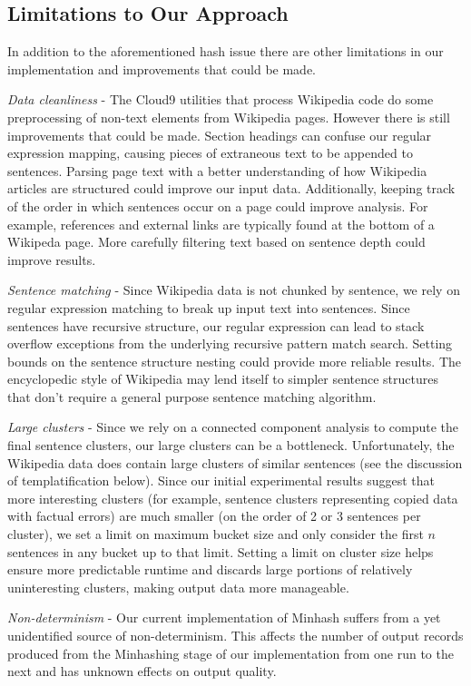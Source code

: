 \documentclass{acm_proc_article-sp}
\begin{document}
\subsection{Limitations to Our Approach}

In addition to the aforementioned hash issue there are other limitations in our implementation and improvements that could be made.

\emph{Data cleanliness} - The Cloud9 utilities that process Wikipedia code do some preprocessing of non-text elements from Wikipedia pages. However there is still improvements that could be made. Section headings can confuse our regular expression mapping, causing pieces of extraneous text to be appended to sentences. Parsing page text with a better understanding of how Wikipedia articles are structured could improve our input data. Additionally, keeping track of the order in which sentences occur on a page could improve analysis. For example, references and external links are typically found at the bottom of a Wikipeda page. More carefully filtering text based on sentence depth could improve results.

\emph{Sentence matching} - Since Wikipedia data is not chunked by sentence, we rely on regular expression matching to break up input text into sentences. Since sentences have recursive structure, our regular expression can lead to stack overflow exceptions from the underlying recursive pattern match search. Setting bounds on the sentence structure nesting could provide more reliable results. The encyclopedic style of Wikipedia may lend itself to simpler sentence structures that don't require a general purpose sentence matching algorithm.

\emph{Large clusters} - Since we rely on a connected component analysis to compute the final sentence clusters, our large clusters can be a bottleneck. Unfortunately, the Wikipedia data does contain large clusters of similar sentences (see the discussion of templatification below). Since our initial experimental results suggest that more interesting clusters (for example, sentence clusters representing copied data with factual errors) are much smaller (on the order of 2 or 3 sentences per cluster), we set a limit on maximum bucket size and only consider the first $n$ sentences in any bucket up to that limit. Setting a limit on cluster size helps ensure more predictable runtime and discards large portions of relatively uninteresting clusters, making output data more manageable.

\emph{Non-determinism} - Our current implementation of Minhash suffers from a yet unidentified source of non-determinism. This affects the number of output records produced from the Minhashing stage of our implementation from one run to the next and has unknown effects on output quality. 
\end{document}
